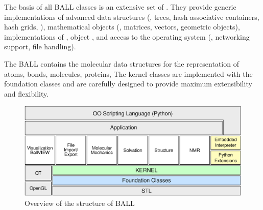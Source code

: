 The basis of all BALL classes is an extensive set of .  They provide generic implementations of advanced data structures
(\eg, trees, hash associative containers, hash grids, \etc), mathematical
objects (\eg, matrices, vectors, geometric objects), implementations of
, object , and access to the
operating system (\eg, networking support, file handling).

The BALL  contains the molecular data structures for the
representation of atoms, bonds, molecules, proteins, \etc  The kernel classes
are implemented with the foundation classes and are carefully designed to
provide maximum extensibility and flexibility.
\begin{figure}[tb]
  \centering\includegraphics[width=\textwidth]{BALL_structure.eps}
  \caption{Overview of the structure of BALL}
  \label{fig:BALL_structure}
\end{figure}


